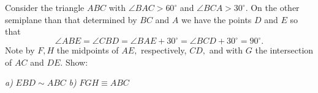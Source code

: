 Consider the triangle $ ABC $ with $ \angle BAC>60^{\circ } $ and $ \angle BCA>30^{\circ } . $ On the other semiplane than that determined by $ BC $ and $ A $ we have the points $ D $ and $ E $ so that
$$ \angle ABE =\angle CBD =\angle BAE +30^{\circ } =\angle BCD +30^{\circ } =90^{\circ } . $$Note by $ F,H $ the midpoints of $ AE, $ respectively, $ CD, $ and with $ G $ the intersection of $ AC $ and $ DE. $ Show:

\textit{a)} $ EBD\sim ABC $
\textit{b)} $ FGH\equiv ABC $